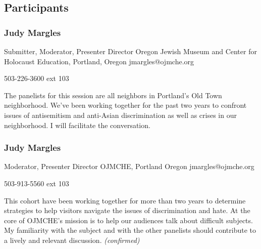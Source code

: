 \documentclass{report}
\begin{document}
            \subsection*{Participants}
              \subsubsection*{ Judy Margles }
              Submitter, Moderator, Presenter\newline
              Director\newline
              Oregon Jewish Museum and Center for Holocaust Education, Portland, Oregon
              \newline
              jmargles@ojmche.org\newline
              
              503-226-3600 ext 103\newline

              The panelists for this session are all neighbors in Portland’s Old Town neighborhood. We’ve been working together for the past two years to confront issues of antisemitism and anti-Asian discrimination as well as crises in our neighborhood. I will facilitate the conversation.\newline


              
                \subsubsection*{ Judy Margles }
                Moderator, Presenter\newline
                Director\newline
                OJMCHE, Portland Oregon
                \newline
                jmargles@ojmche.org\newline
                
                503-913-5560 ext 103\newline

                This cohort have been working together for more than two years to determine strategies to help visitors navigate the issues of discrimination and hate. At the core of OJMCHE's mission is to help our audiences talk about difficult subjects. My familiarity with the subject and with the other panelists should contribute to a lively and relevant discussion.\newline
                \emph{ (confirmed) }
              
\end{document}
